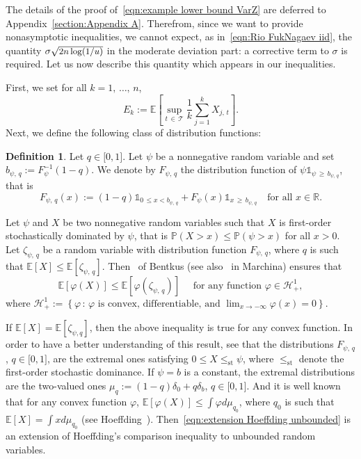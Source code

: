 \documentclass[10pt]{amsart}
\theoremstyle{definition}\newtheorem{defi}[theo]{Definition}\newtheorem{rema}[theo]{Remark}\newtheorem{exam}[theo]{Example}\newtheorem{exem}[theo]{Example}\newtheorem{nota}[theo]{Notation}
\newcommand{\bE}{\mathbb{E}}
\newcommand{\bP}{\mathbb{P}}
\newcommand{\bR}{\mathbb{R}}
\newcommand{\cH}{\mathcal{H}}
\newcommand{\cT}{\mathcal{T}}
\newcommand{\intervalleff}[2]{\mathopen{[} #1\mathclose{}\mathpunct{},#2\mathclose{]}}
\newcommand{\ind}{\mathds{1}}
\begin{document}
The details of the proof of~\eqref{eqn:example lower bound VarZ} are deferred to Appendix~\ref{section:Appendix A}. Therefrom, since we want to provide nonasymptotic inequalities, we cannot expect, as in~\eqref{eqn:Rio FukNagaev iid}, the quantity $\sigma\sqrt{\text{\small{$2n\log(1/u)$}}}$ in the moderate deviation part: a corrective term to $\sigma$ is required. Let us now describe this quantity which appears in our inequalities.

First, we set for all $k=1,\,\ldots,\,n$,
\begin{equation}\label{eqn:def E_k}
E_k:=\bE\left[\sup_{t\,\in\,\cT}\frac 1k\sum_{j=1}^k X_{j,\,t}\right].
\end{equation}
Next, we define the following class of distribution functions:

\begin{defi}\label{def:distrib function}
Let $q\in\intervalleff 01$. Let $\psi$ be a nonnegative random variable and set $b_{\psi,\,q}:=F_\psi^{-1}(1-q)$. We denote by $F_{\psi,\,q}$ the distribution function of $\psi\ind_{\psi\,\geq\,b_{\psi,\,q}}$, that is
\begin{equation}\label{eqn:def distrib function}
F_{\psi,\,q}(x):=(1-q)\ind_{0\,\leq x < b_{\psi,\,q}} + F_{\psi}(x)\ind_{x\,\geq\,b_{\psi,\,q}}\quad\text{for all }x\in\bR.
\end{equation}
\end{defi}

Let $\psi$ and $X$ be two nonnegative random variables such that $X$ is first-order stochastically dominated by $\psi$, that is $\bP(X> x)\leq \bP(\psi>x)$ for all $x>0$. Let $\zeta_{\psi,\,q}$ be a random variable with distribution function $F_{\psi,\,q}$, where $q$ is such that $\bE[X]\leq\bE[\zeta_{\psi,\,q}]$. Then~\cite[Lemma~1]{Bentkus08a} of Bentkus (see also~\cite[Lemma~4.3]{Marchina18a} in Marchina) ensures that
\begin{equation}\label{eqn:extension Hoeffding unbounded}
\bE[\varphi(X)]\leq\bE[\varphi(\zeta_{\psi,\,q})]\quad\text{ for any function }\varphi\in\cH_+^1,
\end{equation}
where $\cH_+^1:=\left\{\varphi\, :\,\varphi\text{ is convex, differentiable, and }\lim_{x\to-\infty}\varphi(x)=0\right\}$.

If $\bE[X]=\bE[\zeta_{\psi, q}]$, then the above inequality is true for any convex function. In order to have a better understanding of this result, see that the distributions $F_{\psi,\,q}$, $q\in\intervalleff 01$, are the extremal ones satisfying $0\leq X\leq_{\text{st}} \psi$, where $\leq_{\text{st}}$ denote the first-order stochastic dominance. If $\psi=b$ is a constant, the extremal distributions are the two-valued ones $\mu_q:=(1-q)\delta_0+q\delta_b$, $q\in\intervalleff 01$. And it is well known that for any convex function $\varphi$, $\bE[\varphi(X)]\leq \int \varphi d\mu_{q_0}$, where $q_0$ is such that $\bE[X]=\int xd\mu_{q_0}$ (see Hoeffding~\cite{Hoeffding63}). Then~\eqref{eqn:extension Hoeffding unbounded} is an extension of Hoeffding's comparison inequality to unbounded random variables.
\end{document}
